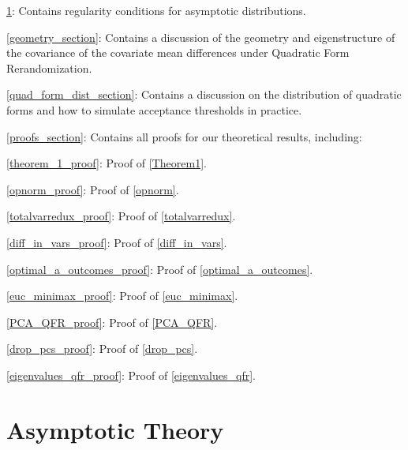 \documentclass[11pt,twoside]{article}
\theoremstyle{definition}
\theoremstyle{remark}
\begin{document}
\begin{description}

\item \cref{asymptotic_theory_sec}: Contains regularity conditions for asymptotic distributions.

\item \cref{geometry_section}: Contains a discussion of the geometry and eigenstructure of the covariance of the covariate mean differences under Quadratic Form Rerandomization.

\item \cref{quad_form_dist_section}: Contains a discussion on the distribution of quadratic forms and how to simulate acceptance thresholds in practice.



\item \cref{proofs_section}: Contains all proofs for our theoretical results, including:
\begin{description}
    \item \cref{theorem_1_proof}: Proof of \cref{Theorem1}.
    \item \cref{opnorm_proof}: Proof of \cref{opnorm}.
    \item \cref{totalvarredux_proof}: Proof of \cref{totalvarredux}.
    \item \cref{diff_in_vars_proof}: Proof of \cref{diff_in_vars}.
    \item \cref{optimal_a_outcomes_proof}: Proof of \cref{optimal_a_outcomes}.
    \item \cref{euc_minimax_proof}: Proof of \cref{euc_minimax}.
    \item \cref{PCA_QFR_proof}: Proof of \cref{PCA_QFR}.
    \item \cref{drop_pcs_proof}: Proof of \cref{drop_pcs}.
    \item \cref{eigenvalues_qfr_proof}: Proof of \cref{eigenvalues_qfr}.
\end{description}

\end{description}

\section{Asymptotic Theory} \label{asymptotic_theory_sec}
\end{document}
